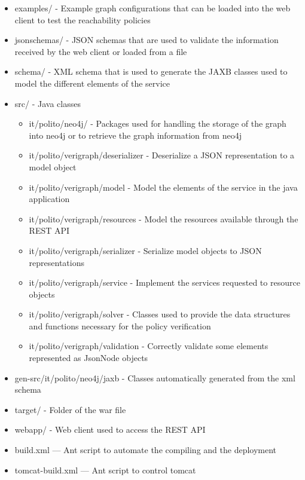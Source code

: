 \begin{itemize}
 \item examples/ - Example graph configurations that can be loaded into the web client to test the reachability policies
 \item jsonschemas/ - JSON schemas that are used to validate the information received by the web client or loaded from a file
 \item schema/ - XML schema that is used to generate the JAXB classes used to model the different elements of the service
 \item src/ - Java classes
	\begin{itemize}
		\item it/polito/neo4j/ - Packages used for handling the storage of the graph into neo4j or to retrieve the graph information from neo4j
 		\item it/polito/verigraph/deserializer - Deserialize a JSON representation to a model object
 		\item it/polito/verigraph/model - Model the elements of the service in the java application
 		\item it/polito/verigraph/resources - Model the resources available through the REST API
 		\item it/polito/verigraph/serializer - Serialize model objects to JSON representations
 		\item it/polito/verigraph/service - Implement the services requested to resource objects
 		\item it/polito/verigraph/solver - Classes used to provide the data structures and functions necessary for the policy verification
 		\item it/polito/verigraph/validation - Correctly validate some elements represented as JsonNode objects
	\end{itemize} 
\item gen-src/it/polito/neo4j/jaxb - Classes automatically generated from the xml schema
 \item target/ - Folder of the war file
 \item webapp/ - Web client used to access the REST API
 \item build.xml — Ant script to automate the compiling and the deployment 
 \item tomcat-build.xml — Ant script to control tomcat
\end{itemize} 